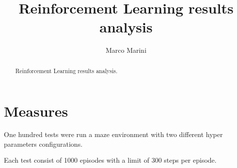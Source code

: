 \documentclass[a4paper,11pt]{article}
\title{Reinforcement Learning results analysis}
\author{Marco Marini}
\begin{document}
\maketitle
\tableofcontents

\begin{abstract}
Reinforcement Learning results analysis.
\end{abstract}

\section{Measures}

One hundred tests were run a maze environment with two different hyper parameters configurations.

Each test consist of 1000 episodes with a limit of 300 steps per episode.
\end{document}
